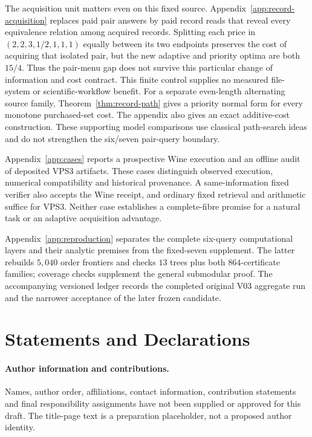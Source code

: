 \documentclass[pdflatex,sn-mathphys-num]{sn-jnl}
\theoremstyle{thmstyleone}
\theoremstyle{thmstylethree}
\theoremstyle{thmstyletwo}
\begin{document}
The acquisition unit matters even on this fixed source. Appendix~\ref{app:record-acquisition} replaces paid pair answers by paid record reads that reveal every equivalence relation among acquired records. Splitting each price in $(2,2,3,1/2,1,1,1)$ equally between its two endpoints preserves the cost of acquiring that isolated pair, but the new adaptive and priority optima are both $15/4$. Thus the pair-menu gap does not survive this particular change of information and cost contract. This finite control supplies no measured file-system or scientific-workflow benefit. For a separate even-length alternating source family, Theorem~\ref{thm:record-path} gives a priority normal form for every monotone purchased-set cost. The appendix also gives an exact additive-cost construction. These supporting model comparisons use classical path-search ideas and do not strengthen the six/seven pair-query boundary.

Appendix~\ref{app:cases} reports a prospective Wine execution and an offline audit of deposited VPS3 artifacts. These cases distinguish observed execution, numerical compatibility and historical provenance. A same-information fixed verifier also accepts the Wine receipt, and ordinary fixed retrieval and arithmetic suffice for VPS3. Neither case establishes a complete-fibre promise for a natural task or an adaptive acquisition advantage.

Appendix~\ref{app:reproduction} separates the complete six-query computational layers and their analytic premises from the fixed-seven supplement. The latter rebuilds $5,040$ order frontiers and checks $13$ trees plus both $864$-certificate families; coverage checks supplement the general submodular proof. The accompanying versioned ledger records the completed original V03 aggregate run and the narrower acceptance of the later frozen candidate.
\label{page:main-end}

\backmatter
\section*{Statements and Declarations}
\paragraph*{Author information and contributions.}
Names, author order, affiliations, contact information, contribution statements and final responsibility assignments have not been supplied or approved for this draft. The title-page text is a preparation placeholder, not a proposed author identity.
\end{document}
